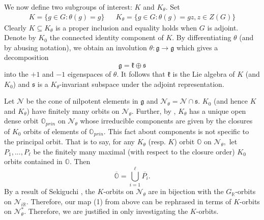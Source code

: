 \documentclass[letterpaper,twosided,11pt]{article}
\theoremstyle{plain}
\theoremstyle{definition}
\theoremstyle{remark}
\newcommand{\R}{\mathbb{R}}
\newcommand{\close}[1]{\overline{#1}}
\newcommand{\ds}{\oplus}
\newcommand{\lie}[1]{\mathfrak{#1}}
\begin{document}
We now define two subgroups of interest: $K$ and $K_\theta.$  Set \begin{align*}  K=\{g\in G: \theta(g)=g\} && K_\theta=\{g\in G: \theta(g)=gz, z\in Z(G)\} \end{align*} 
Clearly $K\subseteq K_\theta$ is a proper inclusion and equality holds when $G$ is adjoint. Denote by $K_0$ the connected identity component of $K.$ By differentiating $\theta$ (and by abusing notation), we obtain an involution $\theta:\lie{g}\to \lie{g}$ which gives a decomposition \[ \lie{g}=\lie{k}\ds \lie{s} \] into the $+1$ and $-1$ eigenspaces of $\theta.$ It follows that $\lie{k}$ is the Lie algebra of $K$ (and $K_0$) and $\lie{s}$ is a $K_\theta$-invariant subspace under the adjoint representation.

 Let $\mathcal{N}$ be the cone of nilpotent elements in $\lie{g}$ and $\mathcal{N}_\theta=\mathcal{N}\cap \lie{s}.$ $K_0$ (and hence $K$ and $K_\theta$)  have finitely many orbits on $\mathcal{N}_\theta.$ Further, by \cite[Theorem 6]{KostantRallis1971}, $K_\theta$ has a unique open dense orbit $\mathbb{O}_{prin}$ on $\mathcal{N}_\theta$ whose irreducible components are given by the closures of $K_0$ orbits of elements of $\mathbb{O}_{prin}.$ This fact about components is not specific to the principal orbit. That is to say, for any $K_\theta$ (resp. $K$) orbit $\mathbb{O}$ on $\mathcal{N}_\theta,$ let $P_1,...,P_\ell$ be the finitely many maximal (with respect to the closure order) $K_0$ orbits contained in $\mathbb{O}.$ Then  \[ \close{\mathbb{O}}=\bigcup_{i=1}^\ell \close{P_i}.\]
By a result of Sekiguchi \cite{Sekiguchi1987}, the $K$-orbits on $\mathcal{N}_\theta$ are in bijection with the $G_\R$-orbits on $\mathcal{N}_{i\R}.$ Therefore, our map (1) from above can be rephrased in terms of $K$-orbits on $\mathcal{N}_\theta^*.$ Therefore, we are justified in only investigating the $K$-orbits.  
\end{document}
